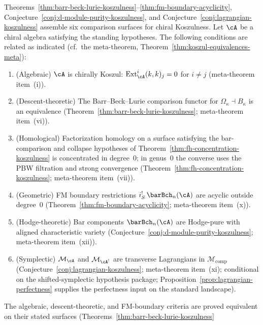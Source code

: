 \begin{remark}
\label{rem:six-faces-koszulness}
Theorems~\ref{thm:barr-beck-lurie-koszulness}--\ref{thm:fm-boundary-acyclicity},
Conjecture~\ref{conj:d-module-purity-koszulness},
and Conjecture~\ref{conj:lagrangian-koszulness}
assemble six comparison surfaces for chiral Koszulness. Let $\cA$ be a
chiral algebra satisfying the standing hypotheses.
The following conditions are related as indicated
\textup{(}cf.\ the meta-theorem, Theorem~\textup{\ref{thm:koszul-equivalences-meta}}\textup{)}:
\begin{enumerate}[label=\textup{(\alph*)}]
\item \textup{(Algebraic)}\quad
 $\cA$ is chirally Koszul:
 $\operatorname{Ext}^i_\cA(k,k)_j = 0$ for $i \neq j$
 \textup{(meta-theorem item~(i))}.
\item \textup{(Descent-theoretic)}\quad
 The Barr--Beck--Lurie comparison functor for
 $\Omega_\kappa \dashv B_\kappa$ is an equivalence
 \textup{(Theorem~\ref{thm:barr-beck-lurie-koszulness};
 meta-theorem item~(vi))}.
\item \textup{(Homological)}\quad
 Factorization homology on a surface satisfying the bar-comparison
 and collapse hypotheses of Theorem~\ref{thm:fh-concentration-koszulness}
 is concentrated in degree~$0$; in genus~$0$ the converse uses the
 PBW filtration and strong convergence
 \textup{(Theorem~\ref{thm:fh-concentration-koszulness};
 meta-theorem item~(vii))}.
\item \textup{(Geometric)}\quad
 FM boundary restrictions $i_S^!\, \barBch_n(\cA)$ are
 acyclic outside degree~$0$
 \textup{(Theorem~\ref{thm:fm-boundary-acyclicity};
 meta-theorem item~(x))}.
\item \textup{(Hodge-theoretic)}\quad
 Bar components $\barBch_n(\cA)$ are Hodge-pure with aligned
 characteristic variety
 \textup{(Conjecture~\ref{conj:d-module-purity-koszulness};
 meta-theorem item~(xii))}.
\item \textup{(Symplectic)}\quad
 $\mathcal{M}_\cA$ and $\mathcal{M}_{\cA^!}$ are transverse
 Lagrangians in $\mathcal{M}_{\mathrm{comp}}$
 \textup{(Conjecture~\ref{conj:lagrangian-koszulness};
 meta-theorem item~(xi);
 conditional on the shifted-symplectic hypothesis package;
 Proposition~\ref{prop:lagrangian-perfectness} supplies the
 perfectness input on the standard landscape)}.
\end{enumerate}
The algebraic, descent-theoretic, and FM-boundary criteria are proved
equivalent on their stated surfaces
\textup{(}Theorems~\ref{thm:barr-beck-lurie-koszulness}

\end{remark}
